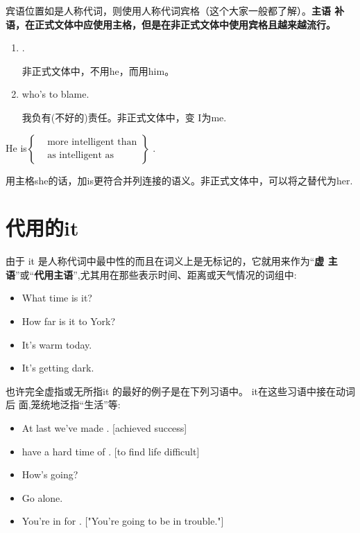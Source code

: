 宾语位置如是人称代词，则使用人称代词宾格（这个大家一般都了解）。\textbf{主语
  补语，在正式文体中应使用主格，但是在非正式文体中使用宾格且越来越流行。}

\begin{enumerate}
\item {}  .

  非正式文体中，不用he，而用him。

\item  {}  who's to blame.

  我负有(不好的)责任。非正式文体中，变 I为me.
\end{enumerate}

He is$ \left\{
  \begin{aligned}
    &\text{more intelligent than} \\
    &\text{as intelligent as}
  \end{aligned}
\right\} $ .

用主格she的话，加is更符合并列连接的语义。非正式文体中，可以将之替代为her.

\section{代用的it}

由于 it 是人称代词中最中性的而且在词义上是无标记的，它就用来作为“\textbf{虚
  主语}”或“\textbf{代用主语}”,尤其用在那些表示时间、距离或天气情况的词组中:
\begin{itemize}
\item What time is it?
\item How far is it to York?
\item It's warm today.
\item It's getting dark.
\end{itemize}

也许完全虚指或无所指it 的最好的例子是在下列习语中。 it在这些习语中接在动词后
面,笼统地泛指“生活”等:
\begin{itemize}
\item At last we've made . [achieved success]
\item have a hard time of . [to find life difficult]
\item How's  going?
\item Go  alone.
\item You're in for . ["You're going to be in trouble."]
\end{itemize}

